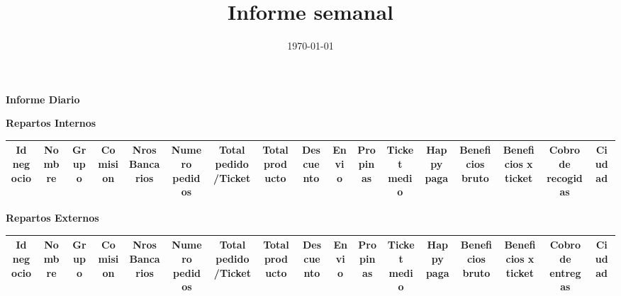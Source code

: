 \documentclass[a4paper,landscape]{article}
\title{Informe semanal}
\date{\today}
\author{}
\begin{document}
\vspace{10mm}
\centering
\begin{LARGE}
\textbf{Informe Diario}

\vspace{2mm}

\end{LARGE}

\vspace{10mm}


\Huge \textbf {Repartos Internos}
\begin{table}[htbp]
\centering
\begin{adjustbox}{width=1\textwidth}
\begin{tabular}{c|c||c|c|c|c|c|c|c|c|c|c|c|c|c|c|c|}
\hline
\rowcolor{int}
 Id negocio & Nombre & Grupo  & Comision & Nros Bancarios & Numero pedidos & Total pedido/Ticket & Total producto & Descuento & Envio & Propinas  & Ticket medio & Happy paga &	Beneficios bruto & Beneficios x ticket & Cobro de recogidas & Ciudad \\
\hline\hline
\hline
\end{tabular}
\end{adjustbox}
\end{table}

\vspace{5mm}

\Huge \textbf {Repartos Externos}
\begin{table}[htbp]
\centering
\begin{adjustbox}{width=1\textwidth}
\begin{tabular}{c|c||c|c|c|c|c|c|c|c|c|c|c|c|c|c|c|}
\hline
\rowcolor{ext}
 Id negocio & Nombre & Grupo  & Comision &  Nros Bancarios & Numero pedidos & Total pedido/Ticket & Total producto & Descuento & Envio & Propinas  & Ticket medio & Happy paga &	Beneficios bruto &	Beneficios x ticket & Cobro de entregas & Ciudad \\
\hline\hline
\hline
\end{tabular}
\end{adjustbox}
\end{table}


\vspace{5mm}
\end{document}

